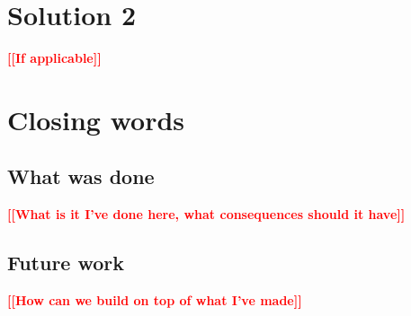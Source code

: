 \documentclass[thesis=B,english,hidelinks]{template/FITthesisXE}
\newcommand{\todo}[1]{\textcolor{red}{\textbf{[[#1]]}}}
\newcommand{\blind}[1][1]{
    \textcolor{gray}{\Blindtext[#1][1]}
}
\begin{document}
\chapter{Solution 2}
    \todo{If applicable}
\chapter{Closing words}
    \section{What was done}
        \todo{What is it I've done here, what consequences should it have}
        \blind[2]
    \section{Future work}
        \todo{How can we build on top of what I've made}
        \blind[2]

    
\end{document}
